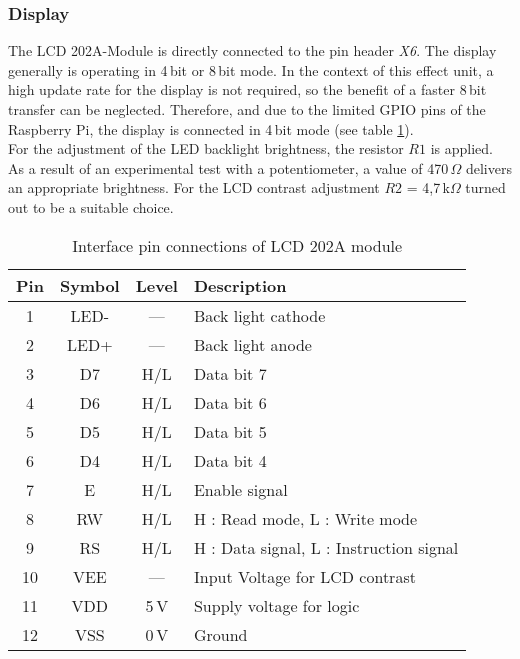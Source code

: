 \subsubsection{Display}

The LCD 202A-Module is directly connected to the pin header \textit{X6}. The display generally is operating in 4\,bit or 8\,bit mode. In the context of this effect unit, a high update rate for the display is not required, so the benefit of a faster 8\,bit transfer can be neglected.
Therefore, and due to the limited GPIO pins of the Raspberry Pi, the display is connected in 4\,bit mode (see table \ref{tab:DisplayPins}).\\
For the adjustment of the LED backlight brightness, the resistor $R1$ is applied.
As a result of an experimental test with a potentiometer, a value of 470\,$\Omega$ delivers an appropriate brightness. For the LCD contrast adjustment $R2$ = 4,7\,k$\Omega$ turned out to be a suitable choice.


\begin{table}[H]
\begin{center}
\begin{tabular}{|c|c|c|p{6cm}|}
\hline 
\textbf{Pin} & \textbf{Symbol} & \textbf{Level} & \textbf{Description} \\ 
\hline 
\hline
1 & LED- & --- & Back light cathode \\ 
\hline 
2 & LED+ & --- & Back light anode \\ 
\hline 
3 & D7 & H/L & Data bit 7 \\ 
\hline 
4 & D6 & H/L & Data bit 6 \\ 
\hline 
5 & D5 & H/L & Data bit 5 \\ 
\hline 
6 & D4 & H/L & Data bit 4 \\ 
\hline 
7 & E & H/L & Enable signal \\ 
\hline 
8 & RW & H/L & H : Read mode, L : Write mode \\ 
\hline 
9 & RS & H/L & H : Data signal, L : Instruction signal \\ 
\hline 
10 & VEE &  --- & Input Voltage for LCD contrast \\ 
\hline 
11 & VDD & 5\,V & Supply voltage for logic \\ 
\hline 
12 & VSS & 0\,V & Ground \\ 
\hline 
\end{tabular} 
\end{center}
\caption{Interface pin connections of LCD 202A module \cite{LCD:2016}}
\label{tab:DisplayPins}
\end{table}

